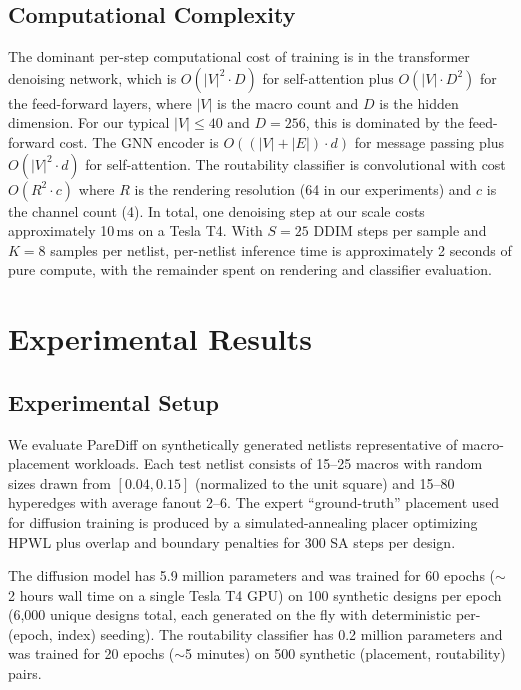 \documentclass[lettersize,journal]{IEEEtran}
\begin{document}
\subsection{Computational Complexity}

The dominant per-step computational cost of training is in the transformer denoising network, which is $O(|V|^2 \cdot D)$ for self-attention plus $O(|V| \cdot D^2)$ for the feed-forward layers, where $|V|$ is the macro count and $D$ is the hidden dimension. For our typical $|V| \le 40$ and $D = 256$, this is dominated by the feed-forward cost. The GNN encoder is $O((|V| + |E|) \cdot d)$ for message passing plus $O(|V|^2 \cdot d)$ for self-attention. The routability classifier is convolutional with cost $O(R^2 \cdot c)$ where $R$ is the rendering resolution (64 in our experiments) and $c$ is the channel count (4). In total, one denoising step at our scale costs approximately 10\,ms on a Tesla T4. With $S = 25$ DDIM steps per sample and $K = 8$ samples per netlist, per-netlist inference time is approximately 2 seconds of pure compute, with the remainder spent on rendering and classifier evaluation.

\section{Experimental Results}
\label{sec:experiments}

\subsection{Experimental Setup}

We evaluate PareDiff on synthetically generated netlists representative of macro-placement workloads. Each test netlist consists of 15--25 macros with random sizes drawn from $[0.04, 0.15]$ (normalized to the unit square) and 15--80 hyperedges with average fanout 2--6. The expert ``ground-truth'' placement used for diffusion training is produced by a simulated-annealing placer optimizing HPWL plus overlap and boundary penalties for 300 SA steps per design.

The diffusion model has 5.9 million parameters and was trained for 60 epochs ($\sim$2 hours wall time on a single Tesla T4 GPU) on 100 synthetic designs per epoch (6{,}000 unique designs total, each generated on the fly with deterministic per-(epoch, index) seeding). The routability classifier has 0.2 million parameters and was trained for 20 epochs ($\sim$5 minutes) on 500 synthetic (placement, routability) pairs.
\end{document}
